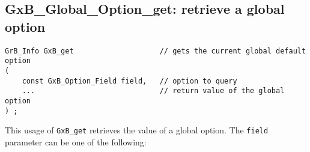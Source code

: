 \documentclass[12pt]{article}
\begin{document}
\subsection{{\sf GxB\_Global\_Option\_get:} retrieve a global option}
\label{gxbget}

\begin{mdframed}[userdefinedwidth=6in]
{\footnotesize
\begin{verbatim}
GrB_Info GxB_get                    // gets the current global default option
(
    const GxB_Option_Field field,   // option to query
    ...                             // return value of the global option
) ;
\end{verbatim} } \end{mdframed}

This usage of \verb'GxB_get' retrieves the value of a global option.  The
\verb'field' parameter can be one of the following:
\end{document}
